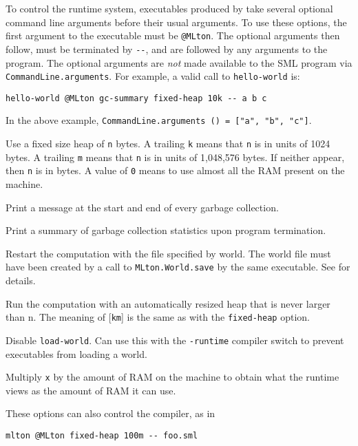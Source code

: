 
To control the runtime system, executables produced by {\mlton} take
several optional command line arguments before their usual arguments.
To use these options, the first argument to the executable must be
\verb+@MLton+.  The optional arguments then follow, must be
terminated by \verb+--+, and are followed by any arguments to the program.
The optional arguments are {\em not} made available to the SML
program via {\tt CommandLine.arguments}.  For example, a valid call
to {\tt hello-world} is: 
\begin{verbatim}
hello-world @MLton gc-summary fixed-heap 10k -- a b c
\end{verbatim}
In the above example, {\tt CommandLine.arguments () = ["a", "b",
"c"]}.

\begin{description}
 Use a fixed size heap of {\tt n} bytes.
 A trailing {\tt k} means that {\tt n} is in units of 1024 bytes. 
 A trailing {\tt m} means that {\tt n} is in units of 1,048,576 bytes. 
 If neither appear, then {\tt n} is in bytes.
 A value of {\tt 0} means to use almost all the RAM present on the
 machine.

Print a message at the start and end of every garbage collection.

Print a summary of garbage collection statistics upon program
termination.

Restart the computation with the file specified by world.
The world file must have been created by a call to
{\tt MLton.World.save} by the same executable.  See 
for details.

Run the computation with an automatically resized heap that is never
larger than n.  The meaning of [{\tt km}] is the same as with the
{\tt fixed-heap} option.

Disable {\tt load-world}.  Can use this with the {\tt -runtime}
compiler switch to prevent executables from loading a world.

Multiply {\tt x} by the amount of RAM on the machine to obtain what
the runtime views as the amount of RAM it can use.
\end{description}
These options can also control the compiler, as in
\begin{verbatim}
mlton @MLton fixed-heap 100m -- foo.sml
\end{verbatim}
